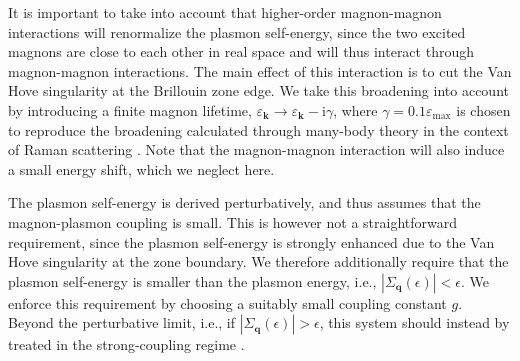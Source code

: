 \documentclass[aps,prb,reprint,twocolumns,superscriptaddress,nofootinbib]{revtex4-2}
\newcommand{\ii}{\mathrm{i}}
\begin{document}
	
	
	It is important to take into account that higher-order magnon-magnon interactions will renormalize the plasmon self-energy, since the two excited magnons  are close to each other in real space and will thus interact through magnon-magnon interactions. The main effect of this interaction is to cut the Van Hove singularity at the Brillouin zone edge. We take this broadening into account by introducing a finite magnon lifetime, $\varepsilon_{\bm k} \rightarrow \varepsilon_{\bm k}-\ii \gamma$, where $\gamma=0.1\varepsilon_{\mathrm{max}}$ is chosen to reproduce the broadening calculated through many-body theory in the context of Raman scattering \cite{canaliTheoryRamanScattering1992}. Note that the magnon-magnon interaction will also induce a small energy shift, which we neglect here.
	
	The plasmon self-energy is derived perturbatively, and thus assumes that the magnon-plasmon coupling is small. This is however not a straightforward requirement, since the plasmon self-energy is strongly enhanced due to the Van Hove singularity at the zone boundary. We therefore additionally require that the plasmon self-energy is smaller than the plasmon energy, i.e., $|\Sigma_{\bm q}(\epsilon)|<\epsilon$. We enforce this requirement by choosing a suitably small coupling constant $g$. Beyond the perturbative limit, i.e., if $|\Sigma_{\bm q}(\epsilon)|>\epsilon$, this system should instead by treated in the strong-coupling regime \cite{verresenAvoidedQuasiparticleDecay2019}.
	
	
\end{document}
